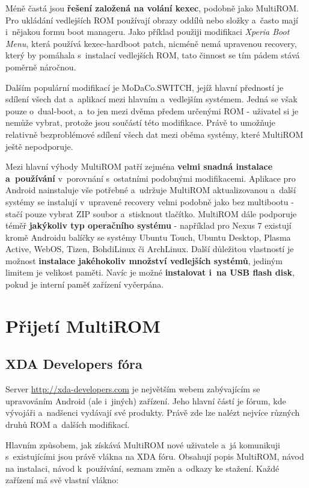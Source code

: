 \documentclass[12pt, a4paper, oneside]{article}
\newcommand{\B}{\textbf} %
\newcommand{\It}{\textit}  %
\begin{document}
Méně častá jsou \B{řešení založená na volání kexec}, podobně jako MultiROM. Pro ukládání vedlejších ROM používají obrazy oddílů nebo složky a~často mají i~nějakou formu boot manageru. Jako příklad použiji modifikaci \It{Xperia Boot Menu}\cite{xperia-boot-menu}, která používá kexec-hardboot patch, nicméně nemá upravenou recovery, který by pomáhala s~instalací vedlejších ROM, tato činnost se tím pádem stává poměrně náročnou.

Dalším populární modifikací je MoDaCo.SWITCH\cite{modaco-switch}, jejíž hlavní předností je sdílení všech dat a~aplikací mezi hlavním a~vedlejším systémem. Jedná se však pouze o~dual-boot, a~to jen mezi dvěma předem určenými ROM - uživatel si je nemůže vybrat, protože jsou součástí této modifikace. Právě to umožňuje relativně bezproblémové sdílení všech dat mezi oběma systémy, které MultiROM ještě nepodporuje.

Mezi hlavní výhody MultiROM patří zejména \B{velmi snadná instalace a~používání} v~porovnání s~ostatními podobnými modifikacemi. Aplikace pro Android nainstaluje vše potřebné a~udržuje MultiROM aktualizovanou a~další systémy se instalují v~upravené recovery velmi podobně jako bez multibootu - stačí pouze vybrat ZIP soubor a~stisknout tlačítko. MultiROM dále podporuje téměř \B{jakýkoliv typ operačního systému} - například pro Nexus 7 existují kromě Androidu balíčky se systémy Ubuntu Touch, Ubuntu Desktop, Plasma Active, WebOS, Tizen, BohdiLinux či ArchLinux. Další důležitou vlastností je možnost \B{instalace jakéhokoliv množství vedlejších systémů}, jediným limitem je velikost paměti. Navíc je možné \B{instalovat i~na USB flash disk}, pokud je interní paměť zařízení vyčerpána.

\section{Přijetí MultiROM}
\subsection{XDA Developers fóra}
Server \url{http://xda-developers.com} je největším webem zabývajícím se upravováním Android (ale i~jiných) zařízení. Jeho hlavní částí je fórum, kde vývojáři a~nadšenci vydávají své produkty. Právě zde lze nalézt nejvíce různých druhů ROM a~dalších modifikací.

Hlavním způsobem, jak získává MultiROM nové uživatele a~já komunikuji s~existujícími jsou právě vlákna na XDA fóru. Obsahují popis MultiROM, návod na instalaci, návod k~používání, seznam změn a~odkazy ke stažení. Každé zařízení má svě vlastní vlákno:
\end{document}
